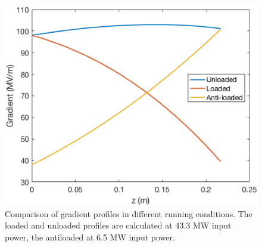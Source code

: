 \begin{figure}[h]
\centering 
\includegraphics[scale=1]{pictures/3gradient.png}
\caption{Comparison of gradient profiles in different running conditions. The loaded and unloaded profiles are calculated at 43.3 MW input power, the antiloaded at 6.5 MW input power. }
\label{3grad}
\end{figure}